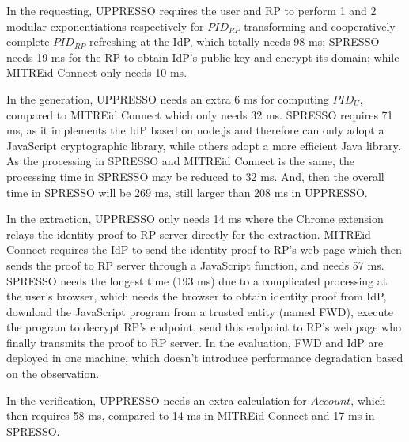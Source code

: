In the requesting, UPPRESSO requires the user and RP to perform 1 and 2  modular exponentiations respectively for $PID_{RP}$ transforming and cooperatively complete $PID_{RP}$ refreshing at the IdP, which totally needs 98 ms;  SPRESSO needs 19 ms for the RP to obtain IdP's public key and encrypt its domain; while MITREid Connect only needs 10 ms.

In the generation, UPPRESSO needs  an extra 6 ms for computing $PID_U$, compared to MITREid Connect which only needs 32 ms.
SPRESSO requires 71 ms, as it implements the IdP based on node.js and therefore can only adopt a JavaScript cryptographic library, while others adopt a more efficient Java library.
As the processing in SPRESSO and MITREid Connect is the same, the processing time in SPRESSO may be reduced to 32 ms. And, then the overall time in SPRESSO will be 269 ms, still larger than 208 ms in UPPRESSO.

In the extraction, UPPRESSO only needs 14 ms where the Chrome extension relays the identity proof to RP server directly for the extraction.
MITREid Connect requires the IdP to send the identity proof to  RP's web page which then sends the proof to RP server through a JavaScript function, and needs 57 ms.
SPRESSO needs the longest time (193 ms) due to a complicated processing at the user's browser,
  which needs the browser to obtain identity proof from IdP, download the JavaScript program from a trusted entity (named FWD), execute the program to decrypt RP's endpoint, send this endpoint to RP's web page who finally transmits the proof to RP server.
In the evaluation,  FWD and IdP are deployed in one machine, which doesn't introduce performance degradation based on the observation. %



In the verification, UPPRESSO needs an extra calculation for $Account$, which then requires  58 ms, compared to 14 ms in MITREid Connect and 17 ms in SPRESSO.



